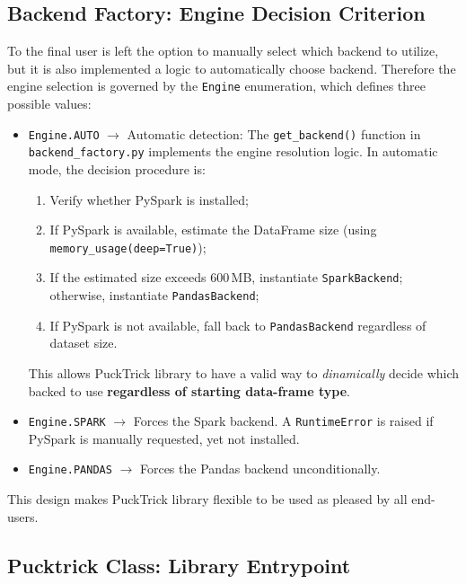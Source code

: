 \documentclass[../main.tex]{subfiles}
\begin{document}
\newpage
\subsection{Backend Factory: Engine Decision Criterion}
\label{sec:factory}

To the final user is left the option to manually select which backend to utilize, but it is also implemented a logic to automatically choose backend. Therefore the engine selection is governed by the \texttt{Engine} enumeration, which defines three possible values:

\begin{itemize}
    \item \texttt{Engine.AUTO} $\to$ Automatic detection: The \texttt{get\_backend()} function in \texttt{backend\_factory.py} implements the engine resolution logic. In automatic mode, the decision procedure is: 
    \begin{enumerate}
        \item Verify whether PySpark is installed;
        \item If PySpark is available, estimate the DataFrame size (using \texttt{memory\_usage(deep=True)});
        \item If the estimated size exceeds 600\,MB, instantiate \texttt{SparkBackend}; otherwise, instantiate \texttt{PandasBackend};
        \item If PySpark is not available, fall back to \texttt{PandasBackend} regardless of dataset size.
    \end{enumerate}
    This allows PuckTrick library to have a valid way to \emph{dinamically} decide which backed to use \textbf{regardless of starting data-frame type}. 
    \item \texttt{Engine.SPARK} $\to$  Forces the Spark backend. A \texttt{RuntimeError} is raised if PySpark is manually requested, yet not installed.
    \item \texttt{Engine.PANDAS} $\to$  Forces the Pandas backend unconditionally.
\end{itemize}

This design makes PuckTrick library flexible to be used as pleased by all end-users. 



\newpage
\subsection{Pucktrick Class: Library Entrypoint}
\label{sec:Pucktrick-class}
\end{document}
